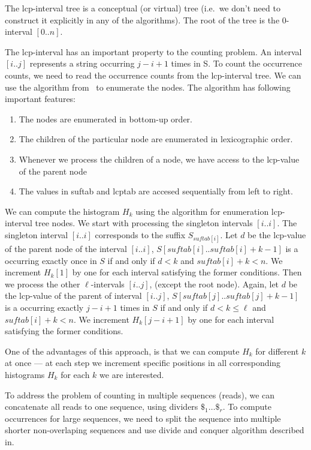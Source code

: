 The lcp-interval tree is a conceptual (or virtual) tree (i.e.\ we don't need to construct it explicitly in any of the algorithms). The root of the tree is the $0$-interval $[0..n]$.

The lcp-interval has an important property to the \kmer counting problem. An interval $[i..j]$ represents a string occurring $j - i + 1$ times in S\cite{tallymer}. To count the \kmer occurrence counts, we need to read the occurrence counts from the lcp-interval tree. We can use the algorithm from~\cite{enhancedsuffixarrays} to enumerate the nodes. The algorithm has following important features:

\begin{enumerate}
  \item The nodes are enumerated in bottom-up order.
  \item The children of the particular node are enumerated in lexicographic order.
  \item Whenever we process the children of a node, we have access to the lcp-value of the parent node %
  \item The values in suftab and lcptab are accesed sequentially from left to right.
\end{enumerate}

We can compute the \kmer histogram $H_k$ using the algorithm for enumeration lcp-interval tree nodes. We start with processing the singleton intervals $[i..i]$. The singleton interval $[i..i]$ corresponds to the suffix $S_{suftab[i]}$. Let $d$ be the lcp-value of the parent node of the interval $[i..i]$, $S[suftab[i]..suftab[i]+k-1]$ is a \kmer occurring exactly once in $S$ if and only if $d < k$ and $suftab[i]+k < n$. We increment $H_k[1]$ by one for each interval satisfying the former conditions.
Then we process the other $\ell$-intervals $[i..j]$, (except the root node). Again, let $d$ be the lcp-value of the parent of interval $[i..j]$, $S[suftab[j]..suftab[j] + k - 1]$ is a \kmer occurring exactly $j - i + 1$ times in $S$ if and only if $d < k \leq \ell$ and $suftab[i]+k < n$. We increment $H_k[j-i+1]$ by one for each interval satisfying the former conditions.

One of the advantages of this approach, is that we can compute $H_k$ for different $k$ at once --- at each step we increment specific positions in all corresponding histograms $H_k$ for each $k$ we are interested.

To address the problem of counting \kmers in multiple sequences (reads), we can concatenate all reads to one sequence, using dividers $\$_1\dots \$_r$. To compute occurrences for large sequences, we need to split the sequence into multiple shorter non-overlaping sequences and use divide and conquer algorithm described in\cite{tallymer}.


